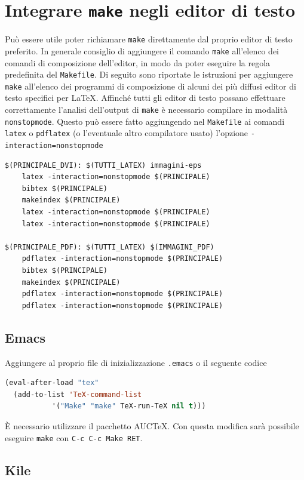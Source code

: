 \section{Integrare \texttt{make} negli editor di testo}
\label{sec:editor}

Può essere utile poter richiamare \texttt{make} direttamente dal proprio editor
di testo preferito.  In generale consiglio di aggiungere il comando
\texttt{make} all'elenco dei comandi di composizione dell'editor, in modo da
poter eseguire la regola predefinita del \texttt{Makefile}.  Di seguito sono
riportate le istruzioni per aggiungere \texttt{make} all'elenco dei programmi di
composizione di alcuni dei più diffusi editor di testo specifici per \LaTeX{}.
Affinché tutti gli editor di testo possano effettuare correttamente l'analisi
dell'output di \texttt{make} è necessario compilare in modalità
\texttt{nonstopmode}.  Questo può essere fatto aggiungendo nel \texttt{Makefile}
ai comandi \texttt{latex} o \texttt{pdflatex} (o l'eventuale altro compilatore
usato) l'opzione \texttt{-interaction=nonstopmode}
\begin{lstlisting}
$(PRINCIPALE_DVI): $(TUTTI_LATEX) immagini-eps
	latex -interaction=nonstopmode $(PRINCIPALE)
	bibtex $(PRINCIPALE)
	makeindex $(PRINCIPALE)
	latex -interaction=nonstopmode $(PRINCIPALE)
	latex -interaction=nonstopmode $(PRINCIPALE)

$(PRINCIPALE_PDF): $(TUTTI_LATEX) $(IMMAGINI_PDF)
	pdflatex -interaction=nonstopmode $(PRINCIPALE)
	bibtex $(PRINCIPALE)
	makeindex $(PRINCIPALE)
	pdflatex -interaction=nonstopmode $(PRINCIPALE)
	pdflatex -interaction=nonstopmode $(PRINCIPALE)
\end{lstlisting}

\subsection{Emacs}
\label{sec:emacs}

Aggiungere al proprio file di inizializzazione \texttt{.emacs} o il seguente codice
\begin{lstlisting}[language=lisp,morekeywords={eval-after-load,add-to-list}]
(eval-after-load "tex"
  (add-to-list 'TeX-command-list
	       '("Make" "make" TeX-run-TeX nil t)))
\end{lstlisting}
È necessario utilizzare il pacchetto AUC\TeX{}.
Con questa modifica sarà possibile eseguire \texttt{make} con
\texttt{C-c C-c Make RET}.

\subsection{Kile}
\label{sec:kile}

